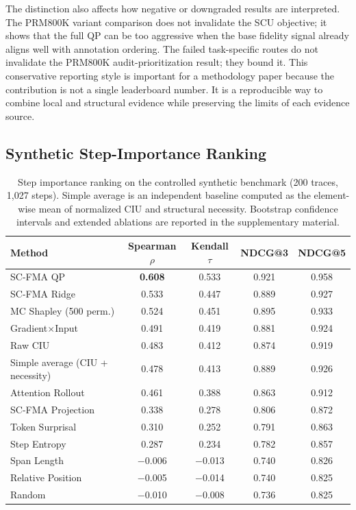 \documentclass[a4paper,fleqn]{cas-sc}
\begin{document}
The distinction also affects how negative or downgraded results are interpreted. The PRM800K variant comparison does not invalidate the SCU objective; it shows that the full QP can be too aggressive when the base fidelity signal already aligns well with annotation ordering. The failed task-specific routes do not invalidate the PRM800K audit-prioritization result; they bound it. This conservative reporting style is important for a methodology paper because the contribution is not a single leaderboard number. It is a reproducible way to combine local and structural evidence while preserving the limits of each evidence source.

\subsection{Synthetic Step-Importance Ranking}

\begin{table}[ht]
\caption{Step importance ranking on the controlled synthetic benchmark (200 traces, 1,027 steps). Simple average is an independent baseline computed as the element-wise mean of normalized CIU and structural necessity. Bootstrap confidence intervals and extended ablations are reported in the supplementary material.}
\label{tab:ranking-results}
\centering
\small
\begin{tabular}{lcccc}
\toprule
\textbf{Method} & \textbf{Spearman $\rho$} & \textbf{Kendall $\tau$} & \textbf{NDCG@3} & \textbf{NDCG@5} \\
\midrule
SC-FMA QP                  & \textbf{0.608} & 0.533 & 0.921 & 0.958 \\
SC-FMA Ridge               & 0.533 & 0.447 & 0.889 & 0.927 \\
MC Shapley (500 perm.)     & 0.524 & 0.451 & 0.895 & 0.933 \\
Gradient$\times$Input      & 0.491 & 0.419 & 0.881 & 0.924 \\
Raw CIU                    & 0.483 & 0.412 & 0.874 & 0.919 \\
Simple average (CIU + necessity) & 0.478 & 0.413 & 0.889 & 0.926 \\
Attention Rollout          & 0.461 & 0.388 & 0.863 & 0.912 \\
SC-FMA Projection          & 0.338 & 0.278 & 0.806 & 0.872 \\
Token Surprisal            & 0.310 & 0.252 & 0.791 & 0.863 \\
Step Entropy               & 0.287 & 0.234 & 0.782 & 0.857 \\
Span Length                & $-$0.006 & $-$0.013 & 0.740 & 0.826 \\
Relative Position          & $-$0.005 & $-$0.014 & 0.740 & 0.825 \\
Random                     & $-$0.010 & $-$0.008 & 0.736 & 0.825 \\
\bottomrule
\end{tabular}
\end{table}
\end{document}
